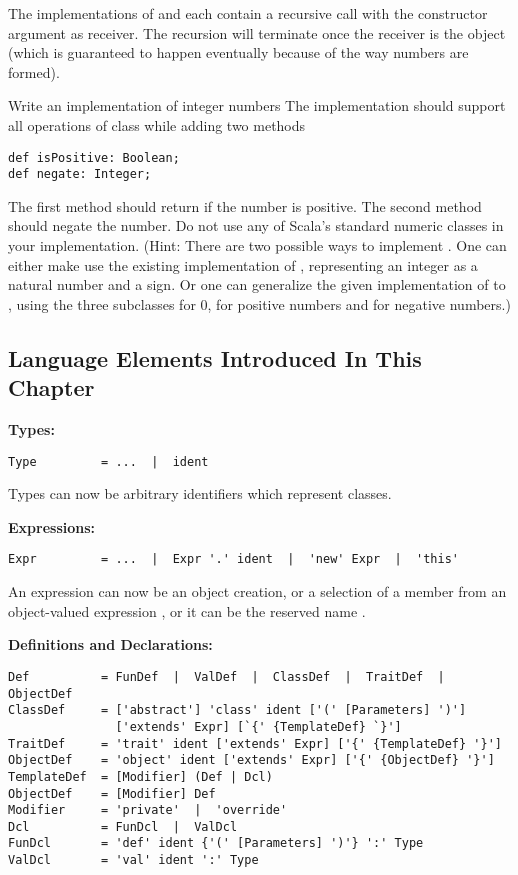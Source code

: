 The implementations of \code{+} and \code{-} each contain a recursive
call with the constructor argument as receiver. The recursion will
terminate once the receiver is the  object (which is
guaranteed to happen eventually because of the way numbers are formed).

\begin{exercise} Write an implementation  of integer numbers
The implementation should support all operations of class 
while adding two methods
\begin{lstlisting}
def isPositive: Boolean;
def negate: Integer;
\end{lstlisting}
The first method should return  if the number is positive. The second method should negate the number.
Do not use any of Scala's standard numeric classes in your
implementation. (Hint: There are two possible ways to implement
. One can either make use the existing implementation of
, representing an integer as a natural number and a sign.
Or one can generalize the given implementation of  to
, using the three subclasses  for 0, 
 for positive numbers and  for negative numbers.)
\end{exercise}



\subsection*{Language Elements Introduced In This Chapter}

\textbf{Types:}
\begin{lstlisting}
Type         = ...  |  ident
\end{lstlisting}

Types can now be arbitrary identifiers which represent classes.

\textbf{Expressions:}
\begin{lstlisting}
Expr         = ...  |  Expr '.' ident  |  'new' Expr  |  'this'
\end{lstlisting}

An expression can now be an object creation, or
a selection  of a member 
from an object-valued expression , or it can be the reserved name .

\textbf{Definitions and Declarations:}
\begin{lstlisting}
Def          = FunDef  |  ValDef  |  ClassDef  |  TraitDef  |  ObjectDef
ClassDef     = ['abstract'] 'class' ident ['(' [Parameters] ')'] 
               ['extends' Expr] [`{' {TemplateDef} `}']
TraitDef     = 'trait' ident ['extends' Expr] ['{' {TemplateDef} '}']
ObjectDef    = 'object' ident ['extends' Expr] ['{' {ObjectDef} '}']
TemplateDef  = [Modifier] (Def | Dcl)
ObjectDef    = [Modifier] Def
Modifier     = 'private'  |  'override'
Dcl          = FunDcl  |  ValDcl
FunDcl       = 'def' ident {'(' [Parameters] ')'} ':' Type
ValDcl       = 'val' ident ':' Type
\end{lstlisting}

